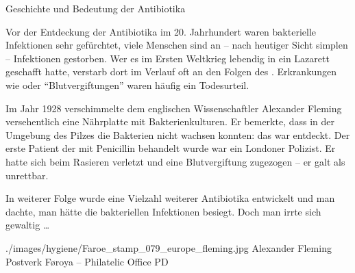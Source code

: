

\TextSlideTeaser
{Geschichte und Bedeutung der Antibiotika}%
{%
Vor der Entdeckung der Antibiotika im 20. Jahrhundert waren
bakterielle Infektionen sehr gefürchtet, viele Menschen sind
an -- nach heutiger Sicht simplen -- Infektionen gestorben.
Wer es im Ersten Weltkrieg lebendig in ein Lazarett geschafft
hatte, verstarb dort im Verlauf  oft an den Folgen des
. Erkrankungen wie  oder
\enquote{Blutvergiftungen} waren häufig ein Todesurteil.

Im Jahr 1928 verschimmelte dem englischen Wissenschaftler
Alexander Fleming versehentlich eine Nährplatte mit
Bakterienkulturen. Er bemerkte, dass in der Umgebung des
Pilzes die Bakterien nicht wachsen konnten: das
 war entdeckt. Der erste Patient der mit
Penicillin behandelt wurde war ein Londoner Polizist. Er
hatte sich beim Rasieren verletzt und eine Blutvergiftung
zugezogen -- er galt als unrettbar.~

In weiterer Folge wurde eine Vielzahl weiterer Antibiotika
entwickelt und man dachte, man hätte die bakteriellen
Infektionen besiegt. Doch man irrte sich gewaltig {\ldots}}%
{}%
{./images/hygiene/Faroe_stamp_079_europe_fleming.jpg}%
{Alexander Fleming}%
{}%
{Postverk Føroya -- Philatelic Office}%
{PD}%


